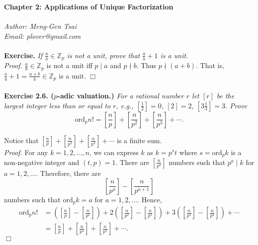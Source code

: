 \documentclass{article}
\begin{document}
\textbf{\Large Chapter 2: Applications of Unique Factorization} \\\\



\emph{Author: Meng-Gen Tsai} \\
\emph{Email: plover@gmail.com} \\\\



\textbf{Exercise.}
\emph{If $\frac{a}{b} \in \mathbb{Z}_{p}$ is not a unit, prove that
$\frac{a}{b} + 1$ is a unit.} \\

\emph{Proof.}
$\frac{a}{b} \in \mathbb{Z}_{p}$ is not a unit iff $p \mid a$ and $p \nmid b$.
Thus $p \nmid (a +b)$. That is, $\frac{a}{b} + 1 = \frac{a + b}{b} \in \mathbb{Z}_{p}$ is a unit.
$\Box$ \\\\



\textbf{Exercise 2.6. ($p$-adic valuation.)}
\emph{For a rational number $r$ let $[r]$ be the largest integer less than or equal to $r$,
e.g., $[\frac{1}{2}] = 0$, $[2] = 2$, $[3 \frac{1}{3}] = 3$. Prove
$$\text{ord}_p n!
= \left[\frac{n}{p}\right] + \left[\frac{n}{p^2}\right] + \left[\frac{n}{p^3}\right] + \cdots.$$
}

Notice that $[\frac{n}{p}] + [\frac{n}{p^2}] + [\frac{n}{p^3}] + \cdots$ is a finite sum. \\

\emph{Proof.}
For any $k = 1, 2, ..., n$, we can express $k$ as $k = p^s t$
where $s = \text{ord}_p k$ is a non-negative integer and $(t, p) = 1$.
There are $[\frac{n}{p^a}]$ numbers such that $p^a \mid k$ for $a = 1, 2, ...$.
Therefore, there are $$\left[\frac{n}{p^a}\right] - \left[\frac{n}{p^{a+1}}\right]$$
numbers such that $\text{ord}_p k = a$ for $a = 1, 2, ...$. Hence,
\begin{align*}
\text{ord}_p n!
&= \left( \left[\frac{n}{p}\right] - \left[\frac{n}{p^2}\right] \right)
 + 2 \left( \left[\frac{n}{p^2}\right] - \left[\frac{n}{p^3}\right] \right)
 + 3 \left( \left[\frac{n}{p^3}\right] - \left[\frac{n}{p^4}\right] \right) + \cdots \\
&= \left[\frac{n}{p}\right] + \left[\frac{n}{p^2}\right] + \left[\frac{n}{p^3}\right] + \cdots.
\end{align*}
$\Box$ \\
\end{document}
